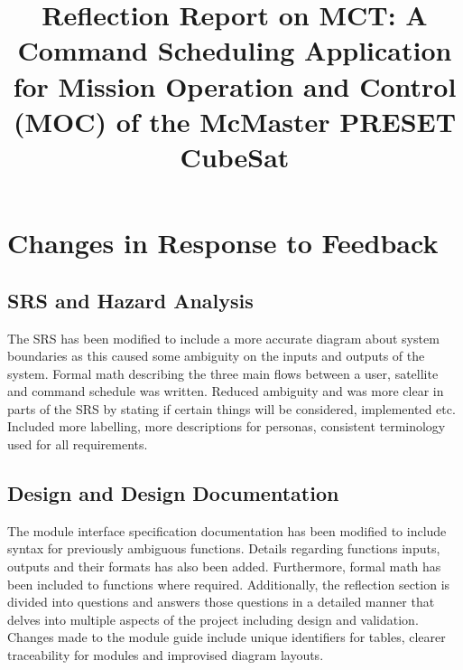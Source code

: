 \documentclass{article}
\title{Reflection Report on MCT: A Command Scheduling Application for Mission Operation and Control (MOC) of the McMaster PRESET CubeSat}
\author{\authname}
\date{}
\begin{document}
\maketitle


\section{Changes in Response to Feedback}



\subsection{SRS and Hazard Analysis}

The SRS has been modified to include a more accurate diagram about system boundaries as this caused some ambiguity on the inputs and outputs of the system. Formal math describing the three main flows between a user, satellite and command schedule was written. Reduced ambiguity and was more clear in parts of the SRS by stating if certain things will be considered, implemented etc. Included more labelling, more descriptions for personas, consistent terminology used for all requirements.

\subsection{Design and Design Documentation}

The module interface specification documentation has been modified to include syntax for previously ambiguous functions. Details regarding functions inputs, outputs and their formats has also been added. Furthermore, formal math has been included to functions where required. Additionally, the reflection section is divided into questions and answers those questions in a detailed manner that delves into multiple aspects of the project including design and validation. Changes made to the module guide include unique identifiers for tables, clearer traceability for modules and improvised diagram layouts.
\end{document}
